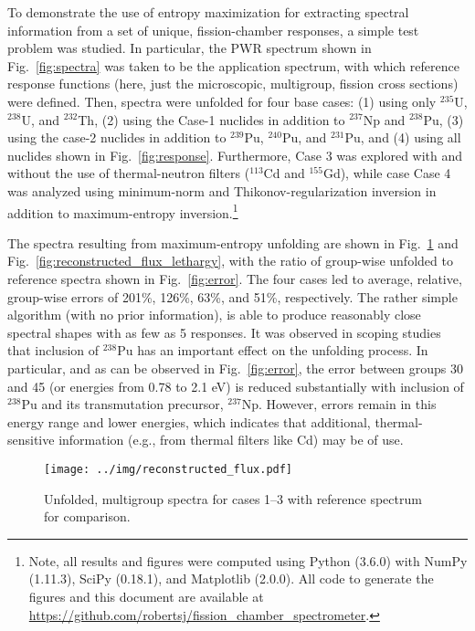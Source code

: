 \documentclass[journal]{IEEEtran}
\newcommand{\FIG}[1]{Fig.~\ref{#1}}               %
\begin{document}
To demonstrate the use of entropy maximization for extracting spectral information from a set of unique, fission-chamber responses,  a simple test problem was studied.  In particular, the PWR spectrum shown in \FIG{fig:spectra} was taken to be the application spectrum, with which reference response functions (here, just the microscopic, multigroup, fission cross sections) were defined.  Then, spectra were unfolded for four base cases: (1) using only ${}^{235}$U, ${}^{238}$U, and ${}^{232}$Th, (2) using the Case-1 nuclides in addition to ${}^{237}$Np and ${}^{238}$Pu, (3) using the case-2 nuclides in addition to ${}^{239}$Pu, ${}^{240}$Pu, and ${}^{231}$Pu, and (4) using all nuclides shown in \FIG{fig:response}.  Furthermore, Case 3 was explored with and without the use of thermal-neutron filters (${}^{113}$Cd and ${}^{155}$Gd), while case Case 4 was analyzed using minimum-norm and Thikonov-regularization inversion in addition to maximum-entropy inversion.\footnote{Note, all results and figures were computed using Python (3.6.0) with NumPy (1.11.3), SciPy (0.18.1), and Matplotlib (2.0.0).  All code to generate the figures and this document are available at \url{https://github.com/robertsj/fission_chamber_spectrometer}.}


The spectra resulting from maximum-entropy unfolding are shown in \FIG{fig:reconstructed_flux} and \FIG{fig:reconstructed_flux_lethargy}, with the ratio of group-wise unfolded to reference spectra shown in \FIG{fig:error}. The four cases led to average, relative, group-wise errors of 201\%, 126\%, 63\%, and 51\%, respectively.   The rather simple algorithm (with no prior information), is able to produce reasonably close spectral shapes with as few as 5 responses.  It was observed in scoping studies that inclusion of ${}^{238}$Pu has an important effect on the unfolding process.  In particular, and as can be observed in \FIG{fig:error}, the error between groups 30 and 45 (or energies from 0.78 to 2.1 eV) is reduced substantially with inclusion of ${}^{238}$Pu and its transmutation precursor, ${}^{237}$Np.  However, errors remain in this energy range and lower energies, which indicates that additional, thermal-sensitive information (e.g., from thermal filters like Cd) may be of use.

\begin{figure}[h!tb]
  \centering
  \texttt{[image: ../img/reconstructed\_flux.pdf]}
  \caption{Unfolded, multigroup spectra for cases 1--3 with reference spectrum for comparison.}
  \label{fig:reconstructed_flux}
\end{figure}
\end{document}
